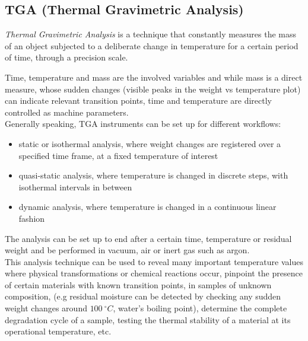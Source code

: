 \documentclass{article}
\begin{document}
        \clearpage
        \subsection{TGA (Thermal Gravimetric Analysis)\label{TGA_Analysis}}
        
        \textit{Thermal Gravimetric Analysis} is a technique that constantly measures the mass of an object subjected to a deliberate 
        change in temperature for a certain period of time, through a precision scale. 

        Time, temperature and mass are the involved variables and while mass is a direct measure, whose sudden changes (visible peaks
        in the weight vs temperature plot) can indicate relevant transition points, time and temperature are directly controlled 
        as machine parameters. \\ 

        Generally speaking, TGA instruments can be set up for different workflows: 

                \begin{itemize}
                    \item static or isothermal analysis, where weight changes are registered over a specified time frame, 
                    at a fixed temperature of interest
                    \item quasi-static analysis, where temperature is changed in discrete steps, with isothermal intervals in between 
                    \item dynamic analysis, where temperature is changed in a continuous linear fashion
                \end{itemize}

            The analysis can be set up to end after a certain time, temperature or residual weight and be performed 
            in vacuum, air or inert gas such as argon. \\

        This analysis technique can be used to reveal many important temperature values where physical transformations or chemical 
        reactions occur, pinpoint the presence of certain materials with known transition points, in samples of unknown composition, 
        (e.g residual moisture can be detected by checking any sudden weight changes around $100 \ ^{\circ}C $, water's boiling point), 
        determine the complete degradation cycle of a sample, testing the thermal stability of a material at its operational temperature, etc. \\ 
        
\end{document}
